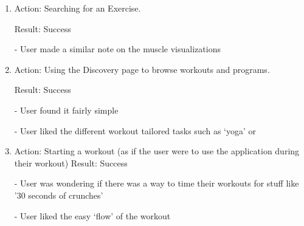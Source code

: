 \documentclass[12pt, titlepage]{article}
\begin{document}
\begin{enumerate}
\item Action: Searching for an Exercise.

Result: Success

-	User made a similar note on the muscle visualizations

\item Action: Using the Discovery page to browse workouts and programs.

Result: Success

-	User found it fairly simple

-	User liked the different workout tailored tasks such as ‘yoga’ or 


\item Action: Starting a workout (as if the user were to use the application during their workout)
Result:  Success

-	User was wondering if there was a way to time their workouts for stuff like ’30 seconds of crunches’

-	User liked the easy ‘flow’ of the workout

\end{enumerate}
\end{document}
